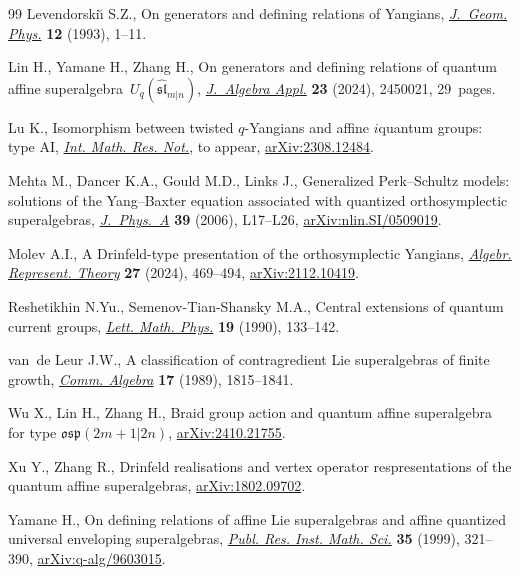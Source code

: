 \documentclass[10pt,a4paper]{amsart}
\numberwithin{equation}{section}
\begin{document}
\begin{thebibliography}{99}
Levendorski\u{\i} S.Z., On generators and defining relations of {Y}angians,
 \href{https://doi.org/10.1016/0393-0440(93)90084-R}{\textit{J.~Geom. Phys.}} \textbf{12} (1993), 1--11.

Lin H., Yamane H., Zhang H., On generators and defining relations of quantum
 affine superalgebra~{$U_q (\widehat{\mathfrak{sl}}_{m|n})$},
 \href{https://doi.org/10.1142/S021949882450021X}{\textit{J.~Algebra Appl.}} \textbf{23} (2024), 2450021, 29~pages.

Lu K., Isomorphism between twisted $q$-Yangians and affine $i$quantum groups:
 type AI, \href{https://doi.org/10.1093/imrn/rnae248}{\textit{Int. Math. Res. Not.}}, {t}o appear, \href{https://arxiv.org/abs/2308.12484}{arXiv:2308.12484}.

Mehta M., Dancer K.A., Gould M.D., Links J., Generalized {P}erk--{S}chultz
 models: solutions of the {Y}ang--{B}axter equation associated with quantized
 orthosymplectic superalgebras, \href{https://doi.org/10.1088/0305-4470/39/1/L03}{\textit{J.~Phys.~A}} \textbf{39} (2006),
 L17--L26, \href{https://arxiv.org/abs/nlin.SI/0509019}{arXiv:nlin.SI/0509019}.

Molev A.I., A {D}rinfeld-type presentation of the orthosymplectic {Y}angians,
 \href{https://doi.org/10.1007/s10468-023-10227-9}{\textit{Algebr. Represent. Theory}} \textbf{27} (2024), 469--494,
 \href{https://arxiv.org/abs/2112.10419}{arXiv:2112.10419}.

Reshetikhin N.Yu., Semenov-Tian-Shansky M.A., Central extensions of quantum
 current groups, \href{https://doi.org/10.1007/BF01045884}{\textit{Lett. Math. Phys.}} \textbf{19} (1990), 133--142.

van~de Leur J.W., A classification of contragredient {L}ie superalgebras of
 finite growth, \href{https://doi.org/10.1080/00927878908823823}{\textit{Comm. Algebra}} \textbf{17} (1989), 1815--1841.

Wu X., Lin H., Zhang H., Braid group action and quantum affine superalgebra for
 type $\mathfrak{osp}(2m+1|2n)$, \href{https://arxiv.org/abs/2410.21755}{arXiv:2410.21755}.

Xu Y., Zhang R., Drinfeld realisations and vertex operator respresentations of
 the quantum affine superalgebras, \href{https://arxiv.org/abs/1802.09702}{arXiv:1802.09702}.

Yamane H., On defining relations of affine {L}ie superalgebras and affine
 quantized universal enveloping superalgebras, \href{https://doi.org/10.2977/prims/1195143607}{\textit{Publ. Res. Inst. Math.
 Sci.}} \textbf{35} (1999), 321--390, \href{https://arxiv.org/abs/q-alg/9603015}{arXiv:q-alg/9603015}.


\end{thebibliography}
\end{document}
